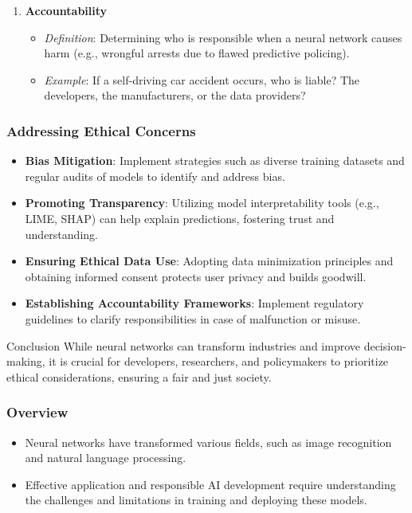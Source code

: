 \documentclass[aspectratio=169]{beamer}
\begin{document}
\begin{frame}[fragile]
\begin{enumerate}
        \item \textbf{Accountability}
            \begin{itemize} 
                \item \textit{Definition}: Determining who is responsible when a neural network causes harm (e.g., wrongful arrests due to flawed predictive policing).
                \item \textit{Example}: If a self-driving car accident occurs, who is liable? The developers, the manufacturers, or the data providers?
            \end{itemize}
    \end{enumerate}
\end{frame}

\begin{frame}[fragile]
    \frametitle{Addressing Ethical Concerns}
    \begin{itemize}
        \item \textbf{Bias Mitigation}: Implement strategies such as diverse training datasets and regular audits of models to identify and address bias.
        \item \textbf{Promoting Transparency}: Utilizing model interpretability tools (e.g., LIME, SHAP) can help explain predictions, fostering trust and understanding.
        \item \textbf{Ensuring Ethical Data Use}: Adopting data minimization principles and obtaining informed consent protects user privacy and builds goodwill.
        \item \textbf{Establishing Accountability Frameworks}: Implement regulatory guidelines to clarify responsibilities in case of malfunction or misuse.
    \end{itemize}
    
    \begin{block}{Conclusion}
        While neural networks can transform industries and improve decision-making, it is crucial for developers, researchers, and policymakers to prioritize ethical considerations, ensuring a fair and just society.
    \end{block}
\end{frame}

\begin{frame}[fragile]
    \frametitle{Overview}
    \begin{itemize}
        \item Neural networks have transformed various fields, such as image recognition and natural language processing.
        \item Effective application and responsible AI development require understanding the challenges and limitations in training and deploying these models.
    \end{itemize}
\end{frame}
\end{document}

